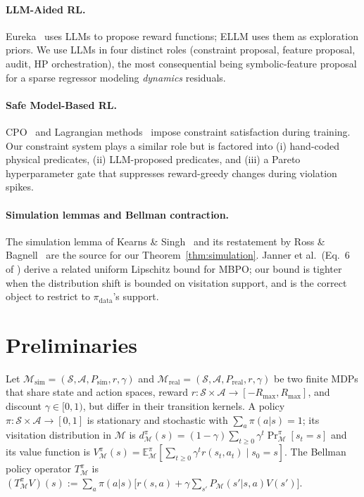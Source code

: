 \documentclass{article}
\theoremstyle{definition}
\newcommand{\Msim}{\mathcal{M}_{\mathrm{sim}}}
\newcommand{\Mreal}{\mathcal{M}_{\mathrm{real}}}
\newcommand{\Psim}{P_{\mathrm{sim}}}
\newcommand{\Preal}{P_{\mathrm{real}}}
\newcommand{\Rmax}{R_{\max}}
\newcommand{\Vpi}{V^{\pi}}
\newcommand{\dpi}{d^{\pi}}
\newcommand{\pidata}{\pi_{\mathrm{data}}}
\begin{document}
\paragraph{LLM-Aided RL.}
Eureka~\cite{eureka2023} uses LLMs to propose reward functions; ELLM
\cite{ellm2023} uses them as exploration priors.  We use LLMs in four
distinct roles (constraint proposal, feature proposal, audit, HP
orchestration), the most consequential being symbolic-feature proposal
for a sparse regressor modeling \emph{dynamics} residuals.

\paragraph{Safe Model-Based RL.}
CPO~\cite{cpo2017} and Lagrangian methods~\cite{ray2019bench} impose
constraint satisfaction during training.  Our constraint system plays a
similar role but is factored into (i) hand-coded physical predicates,
(ii) LLM-proposed predicates, and (iii) a Pareto hyperparameter gate
that suppresses reward-greedy changes during violation spikes.

\paragraph{Simulation lemmas and Bellman contraction.}
The simulation lemma of Kearns \& Singh~\cite{kearns-singh-2002} and its
restatement by Ross \& Bagnell~\cite{ross-bagnell-2012} are the source
for our Theorem~\ref{thm:simulation}.  Janner et al.\ (Eq.~6 of
\cite{mbpo2019}) derive a related uniform Lipschitz bound for MBPO; our
bound is tighter when the distribution shift is bounded on visitation
support, and is the correct object to restrict to $\pidata$'s support.

\section{Preliminaries}
\label{sec:prelim}

Let $\Msim = (\mathcal S, \mathcal A, \Psim, r, \gamma)$ and
$\Mreal = (\mathcal S, \mathcal A, \Preal, r, \gamma)$ be two finite
MDPs that share state and action spaces, reward $r:\mathcal S\times\mathcal A\to[-\Rmax,\Rmax]$,
and discount $\gamma \in [0,1)$, but differ in their transition kernels.
A policy $\pi: \mathcal S\times\mathcal A\to[0,1]$ is stationary and
stochastic with $\sum_a \pi(a|s)=1$; its visitation distribution in
$\mathcal M$ is
$\dpi_{\mathcal M}(s) = (1-\gamma)\sum_{t\ge 0}\gamma^t\Pr^\pi_{\mathcal M}[s_t=s]$
and its value function is
$\Vpi_{\mathcal M}(s) = \mathbb E^{\pi}_{\mathcal M}[\sum_{t\ge 0}\gamma^t r(s_t,a_t)\mid s_0=s]$.
The Bellman policy operator $T^\pi_{\mathcal M}$ is
$(T^\pi_{\mathcal M}V)(s) := \sum_a \pi(a|s)\bigl[r(s,a) + \gamma \sum_{s'} P_{\mathcal M}(s'|s,a) V(s')\bigr]$.
\end{document}
